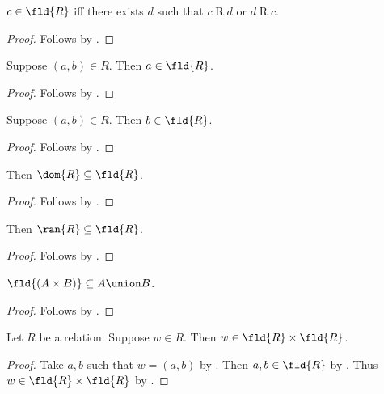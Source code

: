\begin{proposition}\label{fld_iff}
    $c\in\fld{R}$ iff there exists $d$ such that $c\mathrel{R}d$ or $d\mathrel{R}c$.
\end{proposition}
\begin{proof}
    Follows by .
\end{proof}

\begin{proposition}\label{fld_intro_left}
    Suppose $(a,b)\in R$.
    Then $a\in\fld{R}$.
\end{proposition}
\begin{proof}
    Follows by .
\end{proof}

\begin{proposition}\label{fld_intro_right}
    Suppose $(a,b)\in R$.
    Then $b\in\fld{R}$.
\end{proposition}
\begin{proof}
    Follows by .
\end{proof}

\begin{proposition}\label{dom_subseteq_fld}
    Then $\dom{R}\subseteq\fld{R}$.
\end{proposition}
\begin{proof}
    Follows by .
\end{proof}

\begin{proposition}\label{ran_subseteq_fld}
    Then $\ran{R}\subseteq\fld{R}$.
\end{proposition}
\begin{proof}
    Follows by .
\end{proof}

\begin{proposition}\label{fld_times}
    $\fld{(A\times B)}\subseteq A\union B$.
\end{proposition}
\begin{proof}
    Follows by .
\end{proof}

\begin{proposition}\label{relation_elem_times_fld}
    Let $R$ be a relation.
    Suppose $w\in R$.
    Then $w\in\fld{R}\times\fld{R}$.
\end{proposition}
\begin{proof}
    Take $a,b$ such that $w = (a, b)$ by .
    Then $a,b\in\fld{R}$ by .
    Thus $w\in\fld{R}\times\fld{R}$ by .
\end{proof}

